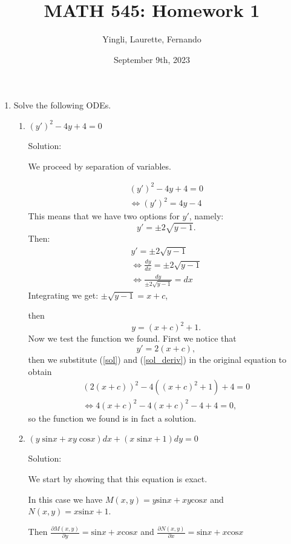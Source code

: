 \documentclass{article}
\title{MATH 545: Homework 1}
\author{Yingli, Laurette, Fernando}
\date{September 9th, 2023}
\begin{document}
\maketitle
\begin{enumerate}
\item Solve the following ODEs.
\begin{enumerate}
	\item $(y')^2 -4y +4 = 0$

		Solution:

		We proceed by separation of variables.

		\begin{align*}
			(y')^2 -4y +4 = 0 \\
			\iff (y')^2 = 4y -4
		\end{align*}
		This means that we have two options for $y'$, namely:
		\[y' = \pm 2\sqrt{y-1}.\]
		Then:
		\begin{align*}
			y' = \pm 2\sqrt{y-1} \\
			\iff \frac{dy}{dx} = \pm 2\sqrt{y-1} \\
			\iff \frac{dy}{\pm 2\sqrt{y-1}} = dx
		\end{align*}
		Integrating we get:
		$\pm \sqrt{y-1} = x+c$,

		then
		\begin{equation} \label{sol}
			y = (x+c)^2 + 1.
		\end{equation}
		Now we test the function we found. First we notice that
		\begin{equation} \label{sol_deriv}
			y' = 2(x+c),
		\end{equation}
		then we substitute (\ref{sol}) and (\ref{sol_deriv}) in the original equation to obtain
		\begin{align*}
			(2(x+c))^2 -4((x+c)^2 + 1) +4 =0 \\
			\iff 4(x+c)^2 -4(x+c)^2 -4 + 4 =0,
		\end{align*}
		so the function we found is in fact a solution.

	\item $(y\;\text{sin} x + xy\;\text{cos}x)dx + (x\;\text{sin}x + 1)dy = 0$

		Solution:
		
		We start by showing that this equation is exact.

		In this case we have $M(x,y) = y\text{sin}x + xy\text{cos}x$ and $N(x,y) = x\text{sin}x + 1$.

		Then $\frac{\partial M(x,y)}{\partial y} = \text{sin}x + x\text{cos}x$ and $\frac{\partial N(x,y)}{\partial x} = \text{sin}x + x\text{cos}x$


\end{enumerate}
\end{enumerate}
\end{document}
